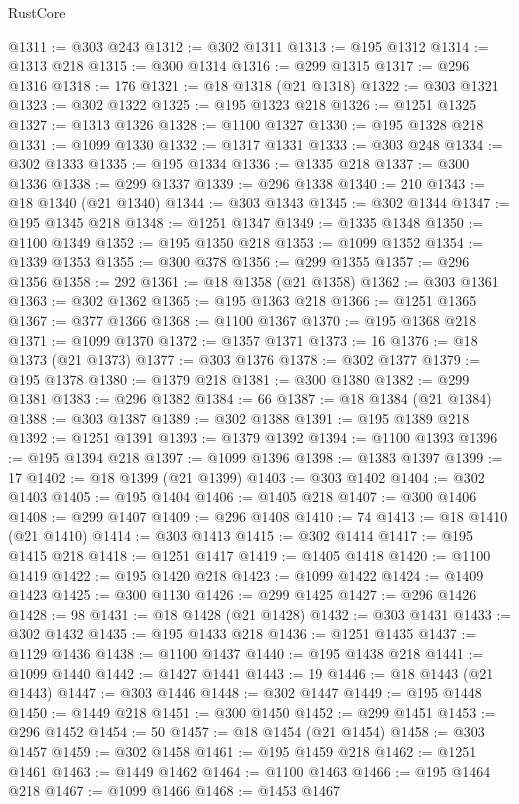 \begin{lexlean}{RustCore}
\begin{coremodule}
@1311 := @303 @243
@1312 := @302 @1311
@1313 := @195 @1312
@1314 := @1313 @218
@1315 := @300 @1314
@1316 := @299 @1315
@1317 := @296 @1316
@1318 := 176
@1321 := @18 @1318 (@21 @1318)
@1322 := @303 @1321
@1323 := @302 @1322
@1325 := @195 @1323 @218
@1326 := @1251 @1325
@1327 := @1313 @1326
@1328 := @1100 @1327
@1330 := @195 @1328 @218
@1331 := @1099 @1330
@1332 := @1317 @1331
@1333 := @303 @248
@1334 := @302 @1333
@1335 := @195 @1334
@1336 := @1335 @218
@1337 := @300 @1336
@1338 := @299 @1337
@1339 := @296 @1338
@1340 := 210
@1343 := @18 @1340 (@21 @1340)
@1344 := @303 @1343
@1345 := @302 @1344
@1347 := @195 @1345 @218
@1348 := @1251 @1347
@1349 := @1335 @1348
@1350 := @1100 @1349
@1352 := @195 @1350 @218
@1353 := @1099 @1352
@1354 := @1339 @1353
@1355 := @300 @378
@1356 := @299 @1355
@1357 := @296 @1356
@1358 := 292
@1361 := @18 @1358 (@21 @1358)
@1362 := @303 @1361
@1363 := @302 @1362
@1365 := @195 @1363 @218
@1366 := @1251 @1365
@1367 := @377 @1366
@1368 := @1100 @1367
@1370 := @195 @1368 @218
@1371 := @1099 @1370
@1372 := @1357 @1371
@1373 := 16
@1376 := @18 @1373 (@21 @1373)
@1377 := @303 @1376
@1378 := @302 @1377
@1379 := @195 @1378
@1380 := @1379 @218
@1381 := @300 @1380
@1382 := @299 @1381
@1383 := @296 @1382
@1384 := 66
@1387 := @18 @1384 (@21 @1384)
@1388 := @303 @1387
@1389 := @302 @1388
@1391 := @195 @1389 @218
@1392 := @1251 @1391
@1393 := @1379 @1392
@1394 := @1100 @1393
@1396 := @195 @1394 @218
@1397 := @1099 @1396
@1398 := @1383 @1397
@1399 := 17
@1402 := @18 @1399 (@21 @1399)
@1403 := @303 @1402
@1404 := @302 @1403
@1405 := @195 @1404
@1406 := @1405 @218
@1407 := @300 @1406
@1408 := @299 @1407
@1409 := @296 @1408
@1410 := 74
@1413 := @18 @1410 (@21 @1410)
@1414 := @303 @1413
@1415 := @302 @1414
@1417 := @195 @1415 @218
@1418 := @1251 @1417
@1419 := @1405 @1418
@1420 := @1100 @1419
@1422 := @195 @1420 @218
@1423 := @1099 @1422
@1424 := @1409 @1423
@1425 := @300 @1130
@1426 := @299 @1425
@1427 := @296 @1426
@1428 := 98
@1431 := @18 @1428 (@21 @1428)
@1432 := @303 @1431
@1433 := @302 @1432
@1435 := @195 @1433 @218
@1436 := @1251 @1435
@1437 := @1129 @1436
@1438 := @1100 @1437
@1440 := @195 @1438 @218
@1441 := @1099 @1440
@1442 := @1427 @1441
@1443 := 19
@1446 := @18 @1443 (@21 @1443)
@1447 := @303 @1446
@1448 := @302 @1447
@1449 := @195 @1448
@1450 := @1449 @218
@1451 := @300 @1450
@1452 := @299 @1451
@1453 := @296 @1452
@1454 := 50
@1457 := @18 @1454 (@21 @1454)
@1458 := @303 @1457
@1459 := @302 @1458
@1461 := @195 @1459 @218
@1462 := @1251 @1461
@1463 := @1449 @1462
@1464 := @1100 @1463
@1466 := @195 @1464 @218
@1467 := @1099 @1466
@1468 := @1453 @1467

\end{coremodule}
\end{lexlean}
